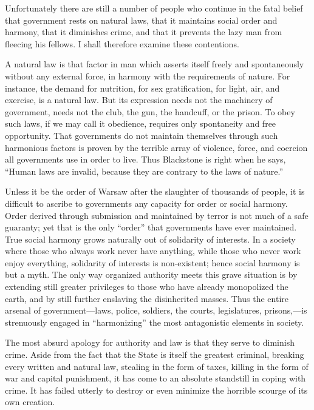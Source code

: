 Unfortunately there are still a number of people who continue in the
fatal belief that government rests on natural laws, that it maintains
social order and harmony, that it diminishes crime, and that it
prevents the lazy man from fleecing his fellows. I shall therefore
examine these contentions.

A natural law is that factor in man which asserts itself freely and
spontaneously without any external force, in harmony with the
requirements of nature. For instance, the demand for nutrition, for
sex gratification, for light, air, and exercise, is a natural law. But
its expression needs not the machinery of government, needs not the
club, the gun, the handcuff, or the prison. To obey such laws, if we
may call it obedience, requires only spontaneity and free opportunity.
That governments do not maintain themselves through such harmonious
factors is proven by the terrible array of violence, force, and
coercion all governments use in order to live. Thus Blackstone is
right when he says, ``Human laws are invalid, because they are
contrary to the laws of nature.''

Unless it be the order of Warsaw after the slaughter of
thousands of people, it is difficult to ascribe to governments any
capacity for order or social harmony. Order derived through submission
and maintained by terror is not much of a safe guaranty; yet that is
the only ``order'' that governments have ever maintained. True social
harmony grows naturally out of solidarity of interests. In a society
where those who always work never have anything, while those who never
work enjoy everything, solidarity of interests is non-existent; hence
social harmony is but a myth. The only way organized authority meets
this grave situation is by extending still greater privileges to those
who have already monopolized the earth, and by still further enslaving
the disinherited masses. Thus the entire arsenal of government---laws,
police, soldiers, the courts, legislatures, prisons,---is strenuously
engaged in ``harmonizing'' the most antagonistic elements in society.

The most absurd apology for authority and law is that they serve to
diminish crime. Aside from the fact that the State is itself the
greatest criminal, breaking every written and natural law, stealing in
the form of taxes, killing in the form of war and capital punishment,
it has come to an absolute standstill in coping with crime. It has
failed utterly to destroy or even minimize the horrible scourge of its
own creation.

